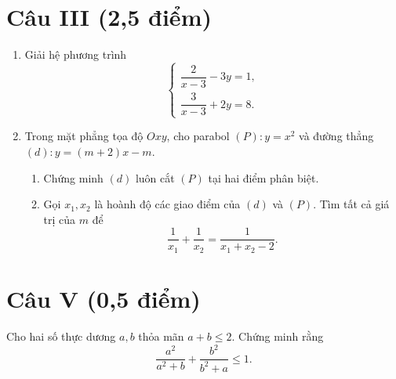 \documentclass[12pt,a4paper]{article}
\begin{document}
\section*{Câu III (2,5 điểm)}
\begin{enumerate}
  \item Giải hệ phương trình
  \[
  \begin{cases}
  \dfrac{2}{x-3}-3y=1,\\[3pt]
  \dfrac{3}{x-3}+2y=8.
  \end{cases}
  \]
  \item Trong mặt phẳng tọa độ $Oxy$, cho parabol $(P):y=x^2$ và đường thẳng $(d):y=(m+2)x-m$.
  \begin{enumerate}[label=\alph*)]
    \item Chứng minh $(d)$ luôn cắt $(P)$ tại hai điểm phân biệt.
    \item Gọi $x_1,x_2$ là hoành độ các giao điểm của $(d)$ và $(P)$. Tìm tất cả giá trị của $m$ để
    \[
    \frac1{x_1}+\frac1{x_2}=\frac1{x_1+x_2-2}.
    \]
  \end{enumerate}
\end{enumerate}

\section*{Câu V (0,5 điểm)}
Cho hai số thực dương $a,b$ thỏa mãn $a+b\le2$. Chứng minh rằng
\[
\frac{a^2}{a^2+b}+\frac{b^2}{b^2+a}\le1.
\]
\end{document}
